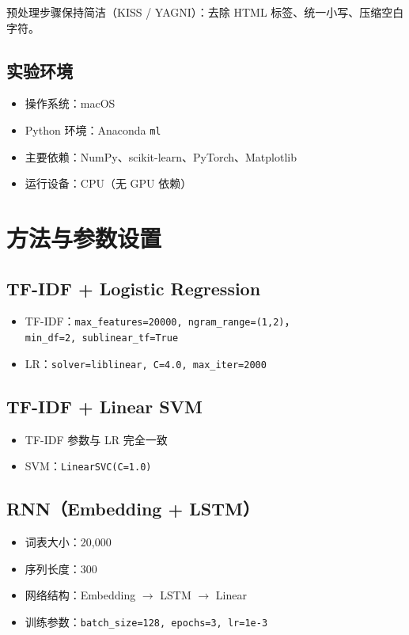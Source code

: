 \documentclass[UTF8,a4paper,12pt]{ctexart}
\begin{document}
预处理步骤保持简洁（KISS / YAGNI）：去除 HTML 标签、统一小写、压缩空白字符。

\subsection{实验环境}
\begin{itemize}
    \item 操作系统：macOS
    \item Python 环境：Anaconda \texttt{ml}
    \item 主要依赖：NumPy、scikit-learn、PyTorch、Matplotlib
    \item 运行设备：CPU（无 GPU 依赖）
\end{itemize}

\section{方法与参数设置}
\subsection{TF-IDF + Logistic Regression}
\begin{itemize}
    \item TF-IDF：\texttt{max\_features=20000, ngram\_range=(1,2)}，\\
    \texttt{min\_df=2, sublinear\_tf=True}
    \item LR：\texttt{solver=liblinear, C=4.0, max\_iter=2000}
\end{itemize}

\subsection{TF-IDF + Linear SVM}
\begin{itemize}
    \item TF-IDF 参数与 LR 完全一致
    \item SVM：\texttt{LinearSVC(C=1.0)}
\end{itemize}

\subsection{RNN（Embedding + LSTM）}
\begin{itemize}
    \item 词表大小：20,000
    \item 序列长度：300
    \item 网络结构：Embedding $\rightarrow$ LSTM $\rightarrow$ Linear
    \item 训练参数：\texttt{batch\_size=128, epochs=3, lr=1e-3}
\end{itemize}
\end{document}

